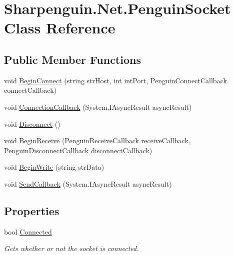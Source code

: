 \hypertarget{classSharpenguin_1_1Net_1_1PenguinSocket}{\section{Sharpenguin.\-Net.\-Penguin\-Socket Class Reference}
\label{classSharpenguin_1_1Net_1_1PenguinSocket}
}
\subsection*{Public Member Functions}
\begin{DoxyCompactItemize}
\item 
void \hyperlink{classSharpenguin_1_1Net_1_1PenguinSocket_a6508a955d89a5aa6a51f8bfac2f52b3e}{Begin\-Connect} (string str\-Host, int int\-Port, Penguin\-Connect\-Callback connect\-Callback)
\item 
void \hyperlink{classSharpenguin_1_1Net_1_1PenguinSocket_ac6fc724da56b753de71deb6aea0d473e}{Connection\-Callback} (System.\-I\-Async\-Result async\-Result)
\item 
void \hyperlink{classSharpenguin_1_1Net_1_1PenguinSocket_ac60926b98466d10e0db01bd48c4b4ad8}{Disconnect} ()
\item 
void \hyperlink{classSharpenguin_1_1Net_1_1PenguinSocket_af55abe0b108fa3b4e94e20a639812b32}{Begin\-Receive} (Penguin\-Receive\-Callback receive\-Callback, Penguin\-Disconnect\-Callback disconnect\-Callback)
\item 
void \hyperlink{classSharpenguin_1_1Net_1_1PenguinSocket_a1a22198956191adbdfcd2649d141f8f6}{Begin\-Write} (string str\-Data)
\item 
void \hyperlink{classSharpenguin_1_1Net_1_1PenguinSocket_a08bb8907688a36801115b1797aca2542}{Send\-Callback} (System.\-I\-Async\-Result async\-Result)
\end{DoxyCompactItemize}
\subsection*{Properties}
\begin{DoxyCompactItemize}
\item 
\hypertarget{classSharpenguin_1_1Net_1_1PenguinSocket_aebcbb81e484814de900b1254e0798717}{bool \hyperlink{classSharpenguin_1_1Net_1_1PenguinSocket_aebcbb81e484814de900b1254e0798717}{Connected}}\label{classSharpenguin_1_1Net_1_1PenguinSocket_aebcbb81e484814de900b1254e0798717}

\begin{DoxyCompactList}\small\item\em Gets whether or not the socket is connected. \end{DoxyCompactList}\end{DoxyCompactItemize}


